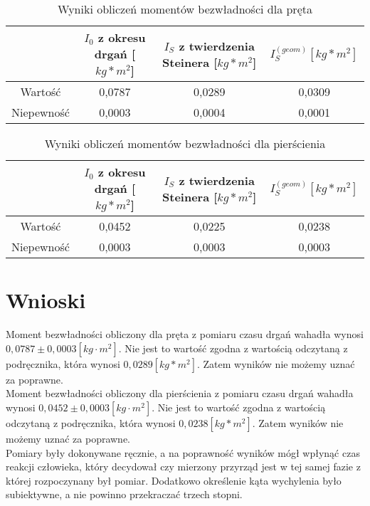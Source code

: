 \documentclass[a4paper,10pt,twoside]{article}
\begin{document}
\begin{table}[h]
	\caption{Wyniki obliczeń momentów bezwładności dla pręta}
 	\begin{tabular}[hb]{|c|c|c|c|}
 		\hline
 		& $I_0$ z okresu drgań [$kg*m^2$] & $I_S$ z twierdzenia Steinera [$kg*m^2$]& $I_S^{(geom)} [kg*m^2]$ \\ \hline
 		Wartość&0,0787&0,0289&0,0309 \\ \hline
 		Niepewność&0,0003&0,0004&0,0001 \\ \hline
 	\end{tabular}
\end{table}

\begin{table}[h]
	\caption{Wyniki obliczeń momentów bezwładności dla pierścienia}
	\begin{tabular}[hb]{|c|c|c|c|}
		\hline
		& $I_0$ z okresu drgań [$kg*m^2$] & $I_S$ z twierdzenia Steinera [$kg*m^2$]& $I_S^{(geom)} [kg*m^2]$ \\ \hline
		Wartość&0,0452&0,0225&0,0238 \\ \hline
		Niepewność&0,0003&0,0003&0,0003 \\ \hline
	\end{tabular}
\end{table}
	\section{Wnioski}
	Moment bezwładności obliczony dla pręta z pomiaru czasu drgań wahadła wynosi $0,0787 \pm 0,0003  [kg\cdot m^2]$. Nie jest to wartość zgodna z wartością odczytaną z podręcznika, która wynosi $0,0289[kg*m^2]$. Zatem wyników nie możemy uznać za poprawne. \\
	Moment bezwładności obliczony dla pierścienia z pomiaru czasu drgań wahadła wynosi $0,0452 \pm 0,0003  [kg\cdot m^2]$. Nie jest to wartość zgodna z wartością odczytaną z podręcznika, która wynosi $0,0238[kg*m^2]$. Zatem wyników nie możemy uznać za poprawne.\\
	Pomiary były dokonywane ręcznie, a na poprawność wyników mógł wpłynąć czas reakcji człowieka, który decydował czy mierzony przyrząd jest w tej samej fazie z której rozpoczynany był pomiar. Dodatkowo określenie kąta wychylenia było subiektywne, a nie powinno przekraczać trzech stopni.
\end{document}
